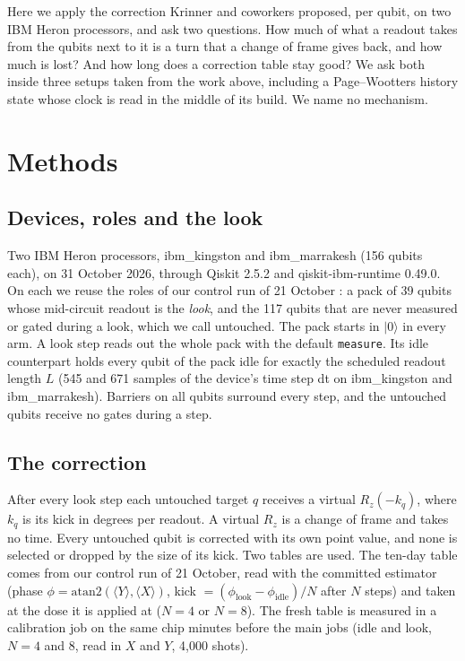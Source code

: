 \documentclass[reprint,amsmath,amssymb,aps,superscriptaddress,nofootinbib]{revtex4-2}
\begin{document}
Here we apply the correction Krinner and coworkers proposed, per qubit, on two IBM Heron processors, and ask two questions. How much of what a readout takes from the qubits next to it is a turn that a change of frame gives back, and how much is lost? And how long does a correction table stay good? We ask both inside three setups taken from the work above, including a Page--Wootters history state \cite{PageWootters1983,Moreva2014,Diaz2025,Coppo2024} whose clock is read in the middle of its build. We name no mechanism.

\section{Methods}

\subsection{Devices, roles and the look}
Two IBM Heron processors, ibm\_kingston and ibm\_marrakesh (156 qubits each), on 31 October 2026, through Qiskit 2.5.2 and qiskit-ibm-runtime 0.49.0. On each we reuse the roles of our control run of 21 October \cite{readout}: a pack of 39 qubits whose mid-circuit readout is the \emph{look}, and the 117 qubits that are never measured or gated during a look, which we call untouched. The pack starts in $|0\rangle$ in every arm. A look step reads out the whole pack with the default \texttt{measure}. Its idle counterpart holds every qubit of the pack idle for exactly the scheduled readout length $L$ (545 and 671 samples of the device's time step dt on ibm\_kingston and ibm\_marrakesh). Barriers on all qubits surround every step, and the untouched qubits receive no gates during a step.

\subsection{The correction}
After every look step each untouched target $q$ receives a virtual $R_z(-k_q)$, where $k_q$ is its kick in degrees per readout. A virtual $R_z$ is a change of frame and takes no time. Every untouched qubit is corrected with its own point value, and none is selected or dropped by the size of its kick. Two tables are used. The ten-day table comes from our control run of 21 October, read with the committed estimator (phase $\phi=\mathrm{atan2}(\langle Y\rangle,\langle X\rangle)$, kick $=(\phi_\mathrm{look}-\phi_\mathrm{idle})/N$ after $N$ steps) and taken at the dose it is applied at ($N=4$ or $N=8$). The fresh table is measured in a calibration job on the same chip minutes before the main jobs (idle and look, $N=4$ and $8$, read in $X$ and $Y$, 4{,}000 shots).
\end{document}
